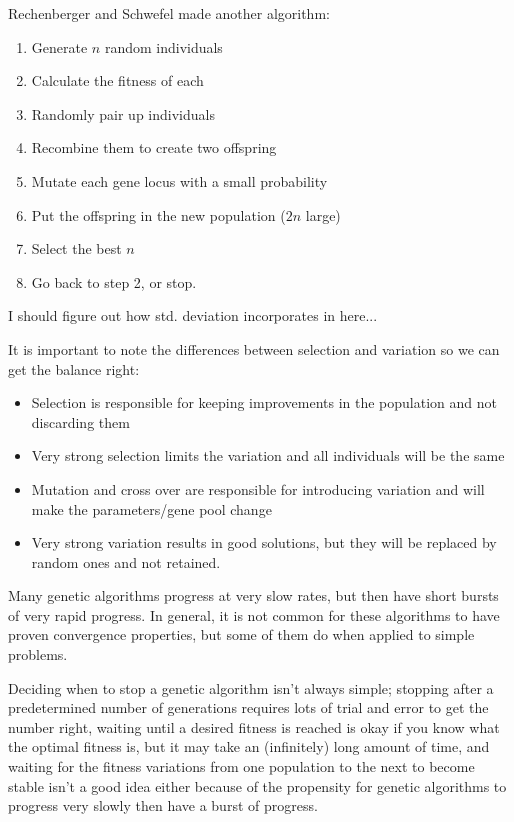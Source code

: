 Rechenberger and Schwefel made another algorithm:

\begin{enumerate}
  \item Generate $n$ random individuals
  \item Calculate the fitness of each
  \item Randomly pair up individuals
  \item Recombine them to create two offspring
  \item Mutate each gene locus with a small probability
  \item Put the offspring in the new population ($2n$ large)
  \item Select the best $n$
  \item Go back to step 2, or stop.
\end{enumerate}


I should figure out how std. deviation incorporates in here...

It is important to note the differences between selection and variation so we
can get the balance right:

\begin{itemize}
  \item Selection is responsible for keeping improvements in the population and
  not discarding them
  \item Very strong selection limits the variation and all individuals will be 
  the same
  \item Mutation and cross over are responsible for introducing variation and 
  will make the parameters/gene pool change
  \item Very strong variation results in good solutions, but they will be 
  replaced by random ones and not retained.
\end{itemize}

Many genetic algorithms progress at very slow rates, but then have short bursts
of very rapid progress. In general, it is not common for these algorithms to
have proven convergence properties, but some of them do when applied to simple
problems.


Deciding when to stop a genetic algorithm isn't always simple; stopping after a
predetermined number of generations requires lots of trial and error to get the
number right, waiting until a desired fitness is reached is okay if you know
what the optimal fitness is, but it may take an (infinitely) long amount of
time, and waiting for the fitness variations from one population to the next to
become stable isn't a good idea either because of the propensity for genetic
algorithms to progress very slowly then have a burst of progress.

